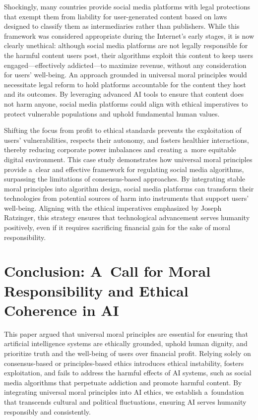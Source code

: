 \documentclass[%
  manuscript=article,
  year=2024,
  volume=77,
  doi=00000.000,
]{zfn}
\begin{document}
Shockingly, many countries provide social media platforms with legal protections that exempt them from liability for user-generated content based on laws designed to classify them as intermediaries rather than publishers. While this framework was considered appropriate during the Internet's early stages, it is now clearly unethical: although social media platforms are not legally responsible for the harmful content users post, their algorithms exploit this content to keep users engaged---effectively addicted---to maximize revenue, without any consideration for users' well-being. An approach grounded in universal moral principles would necessitate legal reform to hold platforms accountable for the content they host and its outcomes. By leveraging advanced AI tools to ensure that content does not harm anyone, social media platforms could align with ethical imperatives to protect vulnerable populations and uphold fundamental human values.



Shifting the focus from profit to ethical standards prevents the exploitation of users' vulnerabilities, respects their autonomy, and fosters healthier interactions, thereby reducing corporate power imbalances and creating a~more equitable digital environment. This case study demonstrates how universal moral principles provide a~clear and effective framework for regulating social media algorithms, surpassing the limitations of consensus-based approaches. By integrating stable moral principles into algorithm design, social media platforms can transform their technologies from potential sources of harm into instruments that support users' well-being. Aligning with the ethical imperatives emphasized by Joseph Ratzinger, this strategy ensures that technological advancement serves humanity positively, even if it requires sacrificing financial gain for the sake of moral responsibility.



\section{Conclusion: A~Call for Moral Responsibility and Ethical Coherence in AI}



This paper argued that universal moral principles are essential for ensuring that artificial intelligence systems are ethically grounded, uphold human dignity, and prioritize truth and the well-being of users over financial profit. Relying solely on consensus-based or principles-based ethics introduces ethical instability, fosters exploitation, and fails to address the harmful effects of AI systems, such as social media algorithms that perpetuate addiction and promote harmful content. By integrating universal moral principles into AI ethics, we establish a~foundation that transcends cultural and political fluctuations, ensuring AI serves humanity responsibly and consistently.
\end{document}
